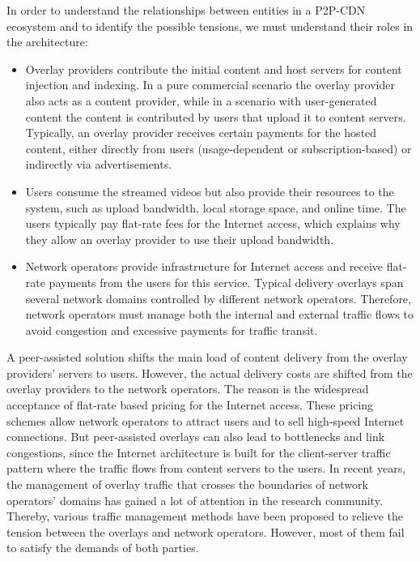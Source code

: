 In order to understand the relationships between entities in a P2P-CDN ecosystem and to identify the possible tensions, we must understand their roles in the architecture:
\begin{itemize}
	\item Overlay providers contribute the initial content and host servers for content injection and indexing. 
	In a pure commercial scenario the overlay provider also acts as a content provider, while in a scenario with user-generated content the content is contributed by users that upload it to content servers. 
	Typically, an overlay provider receives certain payments for the hosted content, either directly from users (usage-dependent or subscription-based) or indirectly via advertisements.
	\item Users consume the streamed videos but also provide their resources to the system, such as upload bandwidth, local storage space, and online time. 
	The users typically pay flat-rate fees for the Internet access, which explains why they allow an overlay provider to use their upload bandwidth.
	\item Network operators provide infrastructure for Internet access and receive flat-rate payments from the users for this service. 
	Typical delivery overlays span several network domains controlled by different network operators. 
	Therefore, network operators must manage both the internal and external traffic flows to avoid congestion and excessive payments for traffic transit.
\end{itemize}

A peer-assisted solution shifts the main load of content delivery from the overlay providers’ servers to users. 
However, the actual delivery costs are shifted from the overlay providers to the network operators. 
The reason is the widespread acceptance of flat-rate based pricing for the Internet access. 
These pricing schemes allow network operators to attract users and to sell high-speed Internet connections. 
But peer-assisted overlays can also lead to bottlenecks and link congestions, since the Internet architecture is built for the client-server traffic pattern where the traffic flows from content servers to the users. 
In recent years, the management of overlay traffic that crosses the boundaries of network operators’ domains has gained a lot of attention in the research community. Thereby, various traffic management methods have been proposed to relieve the tension between the overlays and network operators. 
However, most of them fail to satisfy the demands of both parties.

